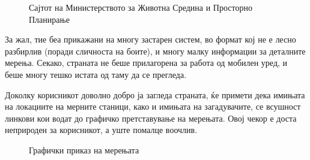 \documentclass{uvamscse}
\begin{document}
\begin{figure}[H]
\centering
  \caption{Сајтот на Министерството за Животна Средина и Просторно Планирање}
  \label{fig:ministerstvo}
\end{figure}

За жал, тие беа прикажани на многу застарен систем, во формат кој не е лесно разбирлив (поради сличноста на боите), и многу малку информации за деталните мерења. Секако, страната не беше прилагорена за работа од мобилен уред, и беше многу тешко истата од таму да се прегледа.
\vspace{5mm}

Доколку корисникот доволно добро ја загледа страната, ќе примети дека имињата на локациите на мерните станици, како и имињата на загадувачите, се всушност линкови кои водат до графичко претставување на мерењата. Овој чекор е доста неприроден за корисникот, а уште помалце воочлив.


\begin{figure}[H]
\centering
  \caption{Графички приказ на мерењата}
  \label{fig:grafik}
\end{figure}
\end{document}
